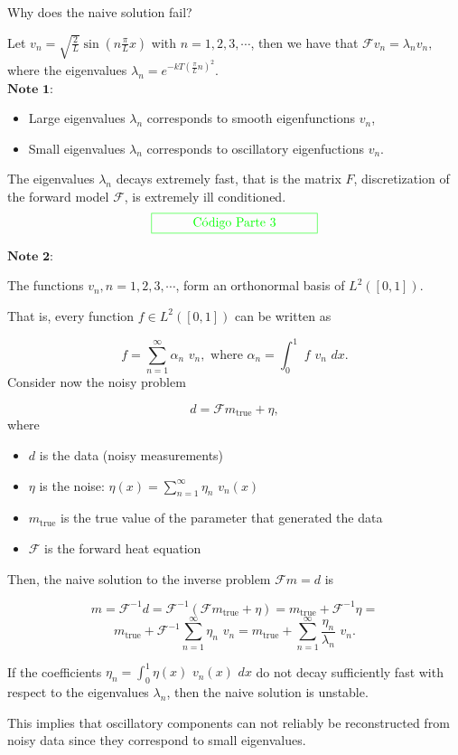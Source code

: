 \documentclass{beamer}
\begin{document}
\begin{frame}
{\color{red} Why does the naive solution fail?}

Let $v_n=\sqrt{\frac{2}{L}}\sin(n\frac{\pi}{L}x)$ with $n=1,2,3,\cdots$, then we have that
$\mathcal{F}v_n=\lambda_n v_n,$ where the eigenvalues $\lambda_n=e^{-kT(\frac{\pi}{L}n)^2}$. \\

$\mathbf{Note \,\, 1}$:

\begin{itemize}
\item    Large eigenvalues $\lambda_n$ corresponds to smooth eigenfunctions $v_n$,
\item Small eigenvalues $\lambda_n$ corresponds to oscillatory eigenfuctions $v_n$.
\end{itemize}

The eigenvalues $\lambda_n$ decays extremely fast, that is the matrix $F$, discretization of the forward model $\mathcal{F}$, is extremely ill conditioned.
$${\color{green} \framebox[2\width]{C\'odigo Parte 3}}$$
\end{frame}

\begin{frame}
$\mathbf{Note \,\, 2}$:

 The functions $v_n, n=1,2,3, \cdots$, form an orthonormal basis of $L^{2}([0,1])$.

That is, every function $f \in L^{2}([0,1])$ can be written as

$$f =\sum_{n=1}^{\infty} \alpha_n \,\, v_n, \mbox{ where } \alpha_n=\int_0^1 \,\, f \,\, v_n\,\, dx.$$
Consider now the noisy problem

$$d = \mathcal{F} m_{\mbox{true}} + \eta,$$
where

\begin{itemize}
\item $d$ is the data (noisy measurements)
\item $\eta$ is the noise: $\eta(x) = \sum_{n=1}^{ \infty} \eta_n \,\, v_n(x)$
\item $m_{\mbox{true}}$ is the true value of the parameter that generated the data
\item $\mathcal{F}$ is the forward heat equation
\end{itemize}
\end{frame}

\begin{frame}
Then, the naive solution to the inverse problem $\mathcal{F}m=d$  is

$$m=\mathcal{F}^{-1}d = \mathcal{F}^{-1} (\mathcal{F} m_{\mbox{true}}+\eta)=m_{\mbox{true}}+ \mathcal{F}^{-1} \eta =$$ $$m_{\mbox{true}}+ \mathcal{F}^{-1} \sum_{n=1}^{ \infty} \eta_n \,\, v_n = m_{\mbox{true}}+ \sum_{n=1}^{ \infty} \frac{\eta_n}{\lambda_n} \,\, v_n.$$

If the coefficients $\eta_n = \int_{0}^{1} \eta(x) \,\, v_n(x) \,\,dx$  do not decay sufficiently fast with respect to the eigenvalues $\lambda_n$, then the naive solution is unstable.

This implies that oscillatory components can not reliably be reconstructed from noisy data since they correspond to small eigenvalues. \\
\end{frame}
\end{document}
